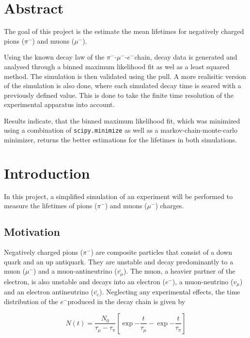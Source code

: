 \documentclass[11pt, a4paper, oneside]{book}
\newcommand{\electron}{$e^{-}$}
\newcommand{\pion}{$\pi^{-}$}
\newcommand{\muon}{$\mu^{-}$}
\begin{document}

\frontmatter

\tableofcontents
\mainmatter

\chapter{Abstract}
The goal of this project is the estimate the mean lifetimes for negatively charged pions (\pion) and muons (\muon). 

Using the known decay law of the \pion-\muon-\electron chain, decay data is generated and analysed through a binned maximum likelihood fit as wel as a least squared method. The simulation is then validated using the pull. A more realisitic version of the simulation is also done, where each simulated decay time is seared with a previously defined value. This is done to take the finite time resolution of the experimental apparatus into account.

Results indicate, that the binned maximum likelihood fit, which was minimized using a combination of \lstinline{scipy.minimize} as well as a markov-chain-monte-carlo minimizer, returns the better estimations for the lifetimes in both simulations. 


\chapter{Introduction}
In this project, a simplified simulation of an experiment will be performed to measure the lifetimes of pions (\pion) and muons (\muon) charges.

\section{Motivation}
Negatively charged pions (\pion) are composite particles that consist of a down quark and an up antiquark. They are unstable and decay predominantly to a muon (\muon) and a muon-antineutrino ($\bar{v_{\mu}}$). The muon, a heavier partner of the electron, is also unstable and decays into an electron (\electron), a muon-neutrino ($v_{\mu}$) and an electron antineutrino ($\bar{v_{e}}$). Neglecting any experimental effects, the time distribution of the \electron produced in the decay chain is given by

\begin{equation}
    N(t) = \frac{N_0}{\tau_{\mu} - \tau_{\pi}}  \left[ \exp{-\frac{t}{\tau_{\mu}}} - \exp{-\frac{t}{\tau_{\pi}}} \right]
    \label{eq:decay_chain_equation}
\end{equation}
\end{document}
